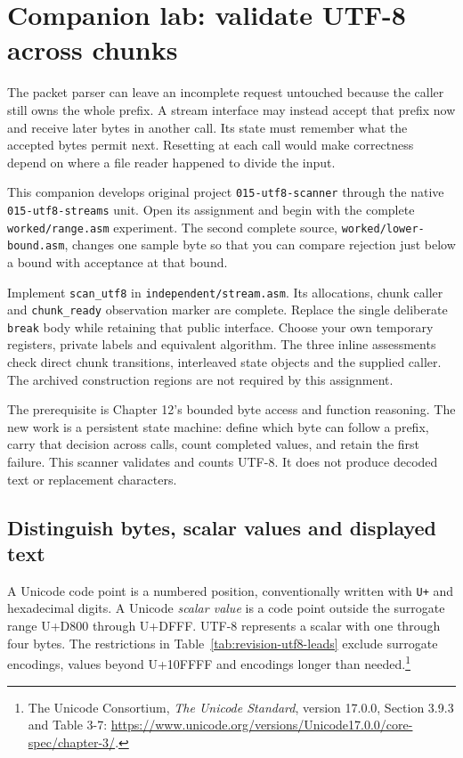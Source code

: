 \section{Companion lab: validate UTF-8 across chunks}
\label{revision-lab:utf8}

The packet parser can leave an incomplete request untouched because the caller
still owns the whole prefix. A stream interface may instead accept that prefix
now and receive later bytes in another call. Its state must remember what the
accepted bytes permit next. Resetting at each call would make correctness depend
on where a file reader happened to divide the input.

This companion develops original project \texttt{015-utf8-scanner} through the
native \texttt{015-utf8-streams} unit. Open its assignment and begin with the
complete \texttt{worked/range.asm} experiment. The second complete source,
\texttt{worked/lower-bound.asm}, changes one sample byte so that you can compare
rejection just below a bound with acceptance at that bound.

Implement \texttt{scan\_utf8} in \texttt{independent/stream.asm}. Its allocations,
chunk caller and \texttt{chunk\_ready} observation marker are complete. Replace the
single deliberate \texttt{break} body while retaining that public interface.
Choose your own temporary registers, private labels and equivalent algorithm.
The three inline assessments check direct chunk transitions, interleaved state
objects and the supplied caller. The archived construction regions are not
required by this assignment.

The prerequisite is Chapter 12's bounded byte access and function reasoning.
The new work is a persistent state machine: define which byte can follow a prefix,
carry that decision across calls, count completed values, and retain the first
failure. This scanner validates and counts UTF-8. It does not produce decoded
text or replacement characters.

\subsection*{Distinguish bytes, scalar values and displayed text}

A Unicode code point is a numbered position, conventionally written with
\texttt{U+} and hexadecimal digits. A Unicode \emph{scalar value} is a code point
outside the surrogate range U+D800 through U+DFFF. UTF-8 represents a scalar with
one through four bytes. The restrictions in Table~\ref{tab:revision-utf8-leads}
exclude surrogate encodings, values beyond U+10FFFF and encodings longer than
needed.\footnote{The Unicode Consortium, \emph{The Unicode Standard}, version
  17.0.0, Section 3.9.3 and Table 3-7:
  \url{https://www.unicode.org/versions/Unicode17.0.0/core-spec/chapter-3/}.}

